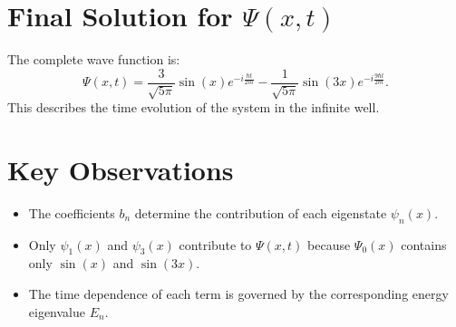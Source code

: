 \documentclass[a4paper,12pt]{article}
\begin{document}
\begin{multicols}{2}
\section{Final Solution for $\Psi(x,t)$}
The complete wave function is:
\[
\Psi(x,t) = \frac{3}{\sqrt{5\pi}} \sin(x) e^{-i \frac{\hbar t}{2m}} - \frac{1}{\sqrt{5\pi}} \sin(3x) e^{-i \frac{9\hbar t}{2m}}.
\]
This describes the time evolution of the system in the infinite well.

\section{Key Observations}
\begin{itemize}
    \item The coefficients $b_n$ determine the contribution of each eigenstate $\psi_n(x)$.
    \item Only $\psi_1(x)$ and $\psi_3(x)$ contribute to $\Psi(x,t)$ because $\Psi_0(x)$ contains only $\sin(x)$ and $\sin(3x)$.
    \item The time dependence of each term is governed by the corresponding energy eigenvalue $E_n$.
\end{itemize}

\end{multicols}
\end{document}
